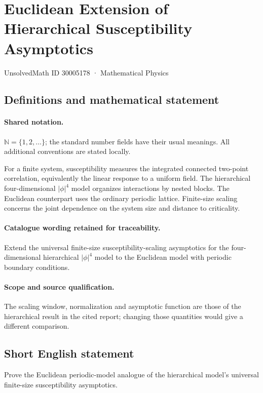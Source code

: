 \documentclass[11pt]{article}
\begin{document}
\setcounter{section}{30005177}
\section{Euclidean Extension of Hierarchical Susceptibility Asymptotics}\label{30005178}
{\small UnsolvedMath ID 30005178 · Mathematical Physics}
\subsection{Definitions and mathematical statement}

\paragraph{Shared notation.}$\mathbb N=\{1,2,\ldots\}$; the standard number fields have their usual meanings. All additional conventions are stated locally.


For a finite system, susceptibility measures the integrated connected two-point correlation, equivalently the linear response to a uniform field. The hierarchical four-dimensional $|\phi|^4$ model organizes interactions by nested blocks. The Euclidean counterpart uses the ordinary periodic lattice. Finite-size scaling concerns the joint dependence on the system size and distance to criticality.

\paragraph{Catalogue wording retained for traceability.}
Extend the universal finite-size susceptibility-scaling asymptotics for the four-dimensional hierarchical $|\phi|^4$ model to the Euclidean model with periodic boundary conditions.

\paragraph{Scope and source qualification.}The scaling window, normalization and asymptotic function are those of the hierarchical result in the cited report; changing those quantities would give a different comparison.
\subsection{Short English statement}
Prove the Euclidean periodic-model analogue of the hierarchical model's universal finite-size susceptibility asymptotics.
\end{document}
